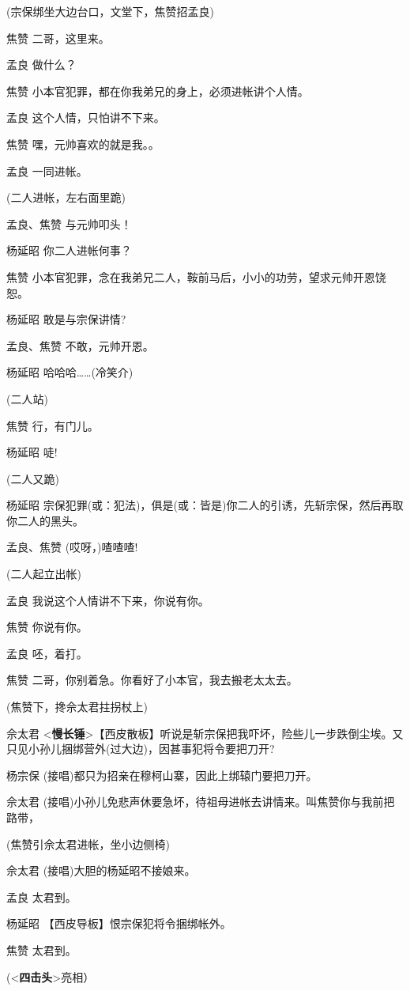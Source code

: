 (宗保绑坐大边台口，文堂下，焦赞招孟良)

焦赞 二哥，这里来。

孟良 做什么？

焦赞 小本官犯罪，都在你我弟兄的身上，必须进帐讲个人情。

孟良 这个人情，只怕讲不下来。

焦赞 嘿，元帅喜欢的就是我。。

孟良 一同进帐。

(二人进帐，左右面里跪)

孟良、焦赞 与元帅叩头！

杨延昭 你二人进帐何事？

焦赞
小本官犯罪，念在我弟兄二人，鞍前马后，小小的功劳，望求元帅开恩饶恕。

杨延昭 敢是与宗保讲情?

孟良、焦赞 不敢，元帅开恩。

杨延昭 哈哈哈\ldots{}\ldots{}(冷笑介)

(二人站)

焦赞 行，有门儿。

杨延昭 唗!

(二人又跪)

杨延昭
宗保犯罪(或：犯法)，俱是(或：皆是)你二人的引诱，先斩宗保，然后再取你二人的黑头。

孟良、焦赞 (哎呀，)喳喳喳!

(二人起立出帐)

孟良 我说这个人情讲不下来，你说有你。

焦赞 你说有你。

孟良 呸，着打。

焦赞 二哥，你别着急。你看好了小本官，我去搬老太太去。

(焦赞下，搀佘太君拄拐杖上)

佘太君
\textless{}\textbf{慢长锤}\textgreater{}【西皮散板】听说是斩宗保把我吓坏，险些儿一步跌倒尘埃。又只见小孙儿捆绑营外(过大边)，因甚事犯将令要把刀开?

杨宗保 (接唱)都只为招亲在穆柯山寨，因此上绑辕门要把刀开。

佘太君
(接唱)小孙儿免悲声休要急坏，待祖母进帐去讲情来。叫焦赞你与我前把路带，

(焦赞引佘太君进帐，坐小边侧椅)

佘太君 (接唱)大胆的杨延昭不接娘来。

孟良 太君到。

杨延昭 【西皮导板】恨宗保犯将令捆绑帐外。

焦赞 太君到。

(\textless{}\textbf{四击头}\textgreater{}亮相）

